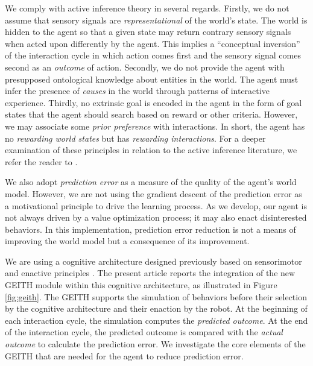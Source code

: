 \documentclass[runningheads]{llncs}
\begin{document}
We comply with active inference theory in several regards. 
Firstly, we do not assume that sensory signals are \textit{representational} of the world's state. 
The world is hidden to the agent so that a given state may return contrary sensory signals when acted upon differently by the agent.
This implies a ``conceptual inversion'' of the interaction cycle in which action comes first and the sensory signal comes second as an  \textit{outcome} of action. 
Secondly, we do not provide the agent with presupposed ontological knowledge about entities in the world. 
The agent must infer the 
presence of \textit{causes} in the world 
through patterns of interactive experience. 
Thirdly, no extrinsic goal is encoded in the agent in the form of goal states that the agent should search based on reward or other criteria. 
However, we may associate some \textit{prior preference} with interactions. 
In short, the agent has no \textit{rewarding world states} but has \textit{rewarding interactions}. %
For a deeper examination of these principles in relation to the active inference literature, we refer the reader to 
\cite{georgeon_artificial_2024}.

We also adopt \textit{prediction error} as a measure of the quality of the agent's world model. %
However, we are not using the gradient descent of the prediction error as a motivational principle to drive the learning process. 
As we develop, our agent is not always driven by a value optimization process; it may also enact disinterested behaviors.
In this implementation, prediction error reduction is not a means of improving the world model but a consequence of its improvement.

We are using a cognitive architecture 
designed previously 
based on sensorimotor and enactive principles \cite{georgeon_artificial_2024}. 
The present article reports the integration of the new GEITH module within this cognitive architecture, as illustrated in Figure \ref{fig:geith}. 
The GEITH supports the simulation of behaviors before their selection by the cognitive architecture and their enaction by the robot. 
At the beginning of each interaction cycle, the simulation computes the \textit{predicted outcome}.
At the end of the interaction cycle, the predicted outcome is compared with the \textit{actual outcome} to calculate the prediction error.   
We investigate the core elements of the GEITH that are needed for the agent to reduce prediction error. 
\end{document}
